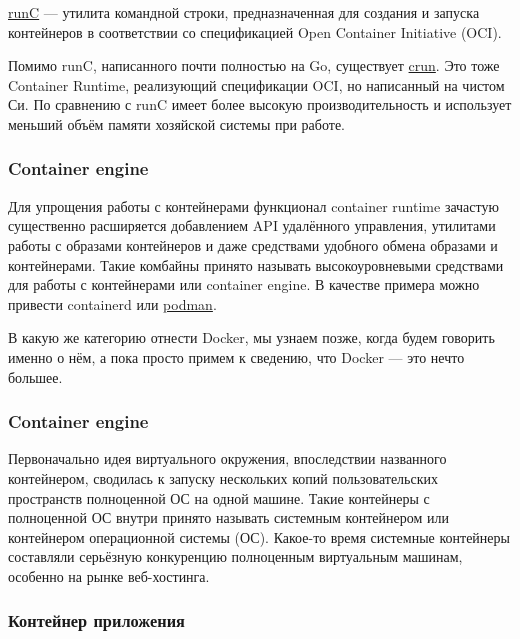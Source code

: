 \documentclass[14pt, a4paper]{article}
\begin{document}
\href{https://github.com/opencontainers/runc}{runC} — утилита командной строки, предназначенная для создания и запуска контейнеров в
соответствии со спецификацией Open Container Initiative (OCI).

Помимо runC, написанного почти полностью на Go, существует \href{https://github.com/containers/crun}{crun}. Это тоже Container Runtime,
реализующий спецификации OCI, но написанный на чистом Си. По сравнению с runC имеет более
высокую производительность и использует меньший объём памяти хозяйской системы при работе.\\


\subsubsection*{Container engine}

Для упрощения работы с контейнерами функционал container runtime зачастую существенно
расширяется добавлением API удалённого управления, утилитами работы с образами контейнеров и
даже средствами удобного обмена образами и контейнерами. Такие комбайны принято называть
высокоуровневыми средствами для работы с контейнерами или container engine. В качестве примера
можно привести containerd или \href{https://podman.io/}{podman}.

В какую же категорию отнести Docker, мы узнаем позже, когда будем говорить именно о нём, а пока
просто примем к сведению, что Docker — это нечто большее.\\


\subsubsection*{Container engine}


Первоначально идея виртуального окружения, впоследствии названного контейнером, сводилась к
запуску нескольких копий пользовательских пространств полноценной ОС на одной машине. Такие
контейнеры с полноценной ОС внутри принято называть системным контейнером или контейнером
операционной системы (ОС). Какое-то время системные контейнеры составляли серьёзную
конкуренцию полноценным виртуальным машинам, особенно на рынке веб-хостинга.\\


\subsubsection*{Контейнер приложения}
\end{document}
